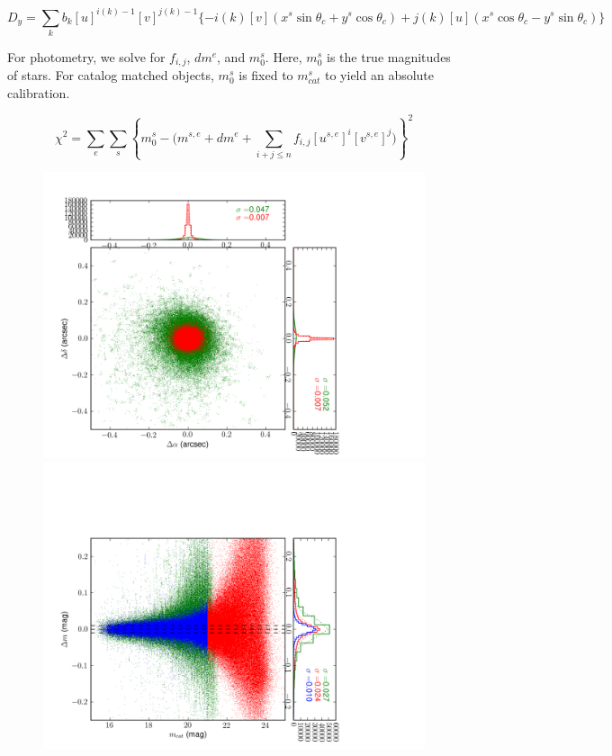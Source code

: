 \documentclass[12pt]{article}
\begin{document}
{\begin{equation}
D_y = \sum_k b_k [u]^{i(k)-1} [v]^{j(k)-1} \{-i(k)[v](x^s\sin\theta_c+y^s\cos\theta_c)+j(k)[u](x^s\cos\theta_c-y^s\sin\theta_c) \} 
\end{equation}

For photometry, we solve for $f_{i,j}$, $dm^e$, and $m_0^s$. Here, $m_0^s$ is the true magnitudes of stars.
For catalog matched objects, $m_0^s$ is fixed to $m_{cat}^s$ to yield an absolute calibration.

\begin{equation}
\chi^2 =  \sum_e \sum_s \left\{ m_0^s - \Biggl( m^{s,e}+dm^e+\sum_{i+j\le n} f_{i,j} [u^{s,e}]^i [v^{s,e}]^j \Biggr) \right\}^2
\end{equation}

\normalsize

\begin{figure}[!htbp]
    \centering
    \includegraphics[scale=0.3]{figures/posScatter150.png}
    \includegraphics[scale=0.3]{figures/fluxScatter150.png}

\end{figure}}
\end{document}
